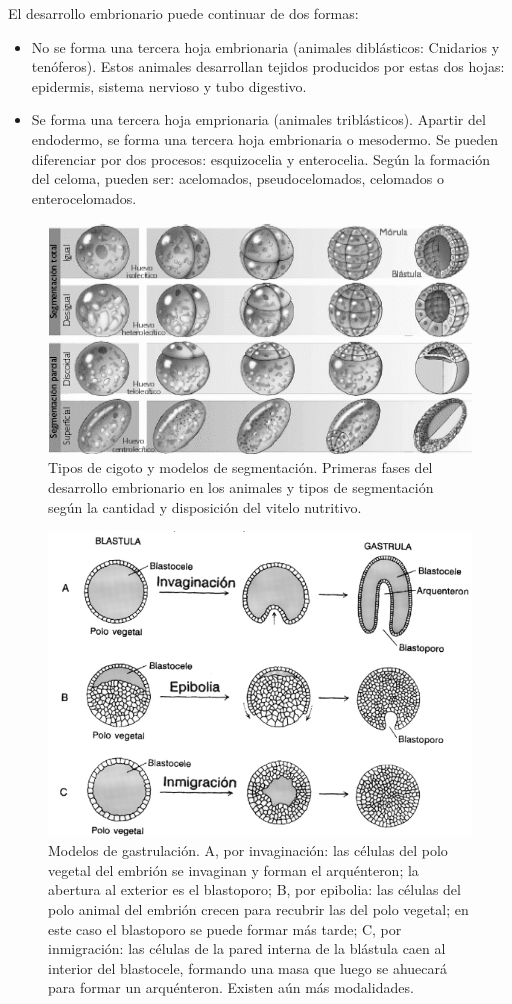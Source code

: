 El desarrollo embrionario puede continuar de dos formas:
\begin{itemize}[itemsep=0pt,parsep=0pt,topsep=0pt,partopsep=0pt]
    \item No se forma una tercera hoja embrionaria (animales diblásticos: Cnidarios y tenóferos). Estos animales desarrollan tejidos producidos por estas dos hojas: epidermis, sistema nervioso y tubo digestivo.
    \item Se forma una tercera hoja emprionaria (animales triblásticos). Apartir del endodermo, se forma una tercera hoja embrionaria o mesodermo. Se pueden diferenciar por dos procesos: esquizocelia y enterocelia. Según la formación del celoma, pueden ser: acelomados, pseudocelomados, celomados o enterocelomados.
\end{itemize}
\begin{figure}[H]
    \centering
    \includegraphics[width=0.8\columnwidth]{A.imagenes/ACV-ANATANIM-SegmetacionGastrulacion}
    \caption[Tipos de cigoto y modelos de segmentación]{Tipos de cigoto y modelos de segmentación. Primeras fases del desarrollo embrionario en los animales y tipos de segmentación según la cantidad y disposición del vitelo nutritivo.}
\end{figure}
\begin{figure}[H]
    \centering
    \includegraphics[width=0.7\columnwidth]{A.imagenes/ACV-ANATANIM-Gastrulacion}
    \caption[Modelos de gastrulación]{Modelos de gastrulación. A, por invaginación: las células del polo vegetal del embrión se invaginan y forman el arquénteron; la abertura al exterior es el blastoporo; B, por epibolia: las células del polo animal del embrión crecen para recubrir las del polo vegetal; en este caso el blastoporo se puede formar más tarde; C, por inmigración: las células de la pared interna de la blástula caen al interior del blastocele, formando una masa que luego se ahuecará para formar un arquénteron. Existen aún más modalidades. }
\end{figure}
